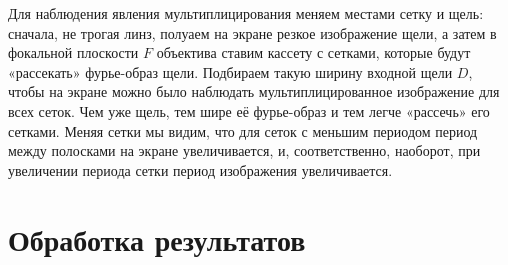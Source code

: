 \documentclass[a4paper,12pt]{article}
\begin{document}
\begin{enumerate}
	Для наблюдения явления мультиплицирования меняем местами сетку и щель: сначала, не трогая линз, полуаем на экране резкое изображение щели, а затем в фокальной плоскости $F$ объектива ставим кассету с сетками, которые будут «рассекать» фурье-образ щели. Подбираем такую ширину входной щели $D$, чтобы на экране можно было наблюдать мультиплицированное изображение для всех сеток. Чем уже щель, тем шире её фурье-образ и тем легче «рассечь» его сетками. Меняя сетки мы видим, что для сеток с меньшим периодом период между полосками на экране увеличивается, и, соответственно, наоборот, при увеличении периода сетки период изображения увеличивается.
	
\end{enumerate}

\section*{Обработка результатов}
\end{document}
